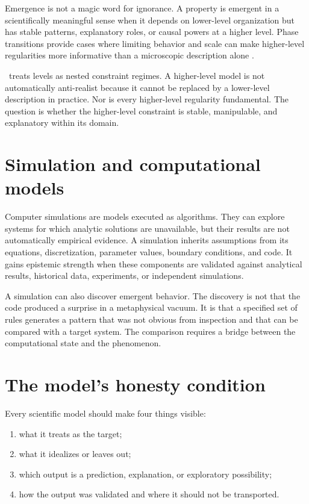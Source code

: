 Emergence is not a magic word for ignorance. A property is emergent in a
scientifically meaningful sense when it depends on lower-level organization but
has stable patterns, explanatory roles, or causal powers at a higher level.
Phase transitions provide cases where limiting behavior and scale can make
higher-level regularities more informative than a microscopic description
alone \citep{batterman2002}.

\RCR\ treats levels as nested constraint regimes. A higher-level model is not
automatically anti-realist because it cannot be replaced by a lower-level
description in practice. Nor is every higher-level regularity fundamental.
The question is whether the higher-level constraint is stable, manipulable,
and explanatory within its domain.

\section{Simulation and computational models}

Computer simulations are models executed as algorithms. They can explore
systems for which analytic solutions are unavailable, but their results are
not automatically empirical evidence. A simulation inherits assumptions from
its equations, discretization, parameter values, boundary conditions, and
code. It gains epistemic strength when these components are validated against
analytical results, historical data, experiments, or independent simulations.

A simulation can also discover emergent behavior. The discovery is not that
the code produced a surprise in a metaphysical vacuum. It is that a specified
set of rules generates a pattern that was not obvious from inspection and that
can be compared with a target system. The comparison requires a bridge between
the computational state and the phenomenon.

\section{The model's honesty condition}

Every scientific model should make four things visible:

\begin{enumerate}
\item what it treats as the target;
\item what it idealizes or leaves out;
\item which output is a prediction, explanation, or exploratory possibility;
\item how the output was validated and where it should not be transported.
\end{enumerate}

